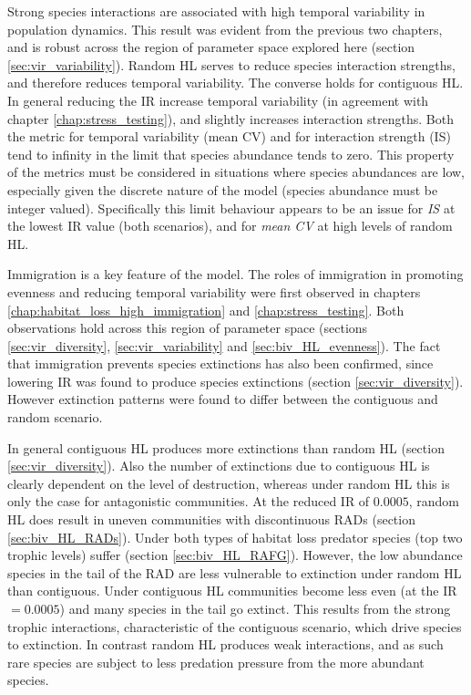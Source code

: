 Strong species interactions are associated with high temporal variability in population dynamics. This result was evident from the previous two chapters, and is robust across the region of parameter space explored here (section \ref{sec:vir_variability}). Random HL serves to reduce species interaction strengths, and therefore reduces temporal variability. The converse holds for contiguous HL. In general reducing the IR increase temporal variability (in agreement with chapter \ref{chap:stress_testing}), and slightly increases interaction strengths. Both the metric for temporal variability (mean CV) and for interaction strength (IS) tend to infinity in the limit that species abundance tends to zero. This property of the metrics must be considered in situations where species abundances are low, especially given the discrete nature of the model (species abundance must be integer valued). Specifically this limit behaviour appears to be an issue for \emph{IS} at the lowest IR value (both scenarios), and for \emph{mean CV} at high levels of random HL.

Immigration is a key feature of the model. The roles of immigration in promoting evenness and reducing temporal variability were first observed in chapters \ref{chap:habitat_loss_high_immigration} and \ref{chap:stress_testing}. Both observations hold across this region of parameter space (sections \ref{sec:vir_diversity}, \ref{sec:vir_variability} and \ref{sec:biv_HL_evenness}). The fact that immigration prevents species extinctions has also been confirmed, since lowering IR was found to produce species extinctions (section \ref{sec:vir_diversity}). However extinction patterns were found to differ between the contiguous and random scenario. 

In general contiguous HL produces more extinctions than random HL (section \ref{sec:vir_diversity}). Also the number of extinctions due to contiguous HL is clearly dependent on the level of destruction, whereas under random HL this is only the case for antagonistic communities. At the reduced IR of $0.0005$, random HL does result in uneven communities with discontinuous RADs (section \ref{sec:biv_HL_RADs}). Under both types of habitat loss predator species (top two trophic levels) suffer (section \ref{sec:biv_HL_RAFG}). However, the low abundance species in the tail of the RAD are less vulnerable to extinction under random HL than contiguous. Under contiguous HL communities become less even (at the IR$=0.0005$) and many species in the tail go extinct. This results from the strong trophic interactions, characteristic of the contiguous scenario, which drive species to extinction. In contrast random HL produces weak interactions, and as such rare species are subject to less predation pressure from the more abundant species. 

